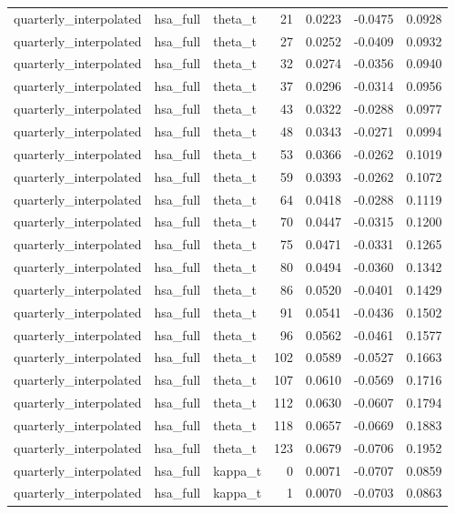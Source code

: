 \begin{tabular}{lllrrrr}
quarterly\_interpolated & hsa\_full & theta\_t & 21 & 0.0223 & -0.0475 & 0.0928 \\
quarterly\_interpolated & hsa\_full & theta\_t & 27 & 0.0252 & -0.0409 & 0.0932 \\
quarterly\_interpolated & hsa\_full & theta\_t & 32 & 0.0274 & -0.0356 & 0.0940 \\
quarterly\_interpolated & hsa\_full & theta\_t & 37 & 0.0296 & -0.0314 & 0.0956 \\
quarterly\_interpolated & hsa\_full & theta\_t & 43 & 0.0322 & -0.0288 & 0.0977 \\
quarterly\_interpolated & hsa\_full & theta\_t & 48 & 0.0343 & -0.0271 & 0.0994 \\
quarterly\_interpolated & hsa\_full & theta\_t & 53 & 0.0366 & -0.0262 & 0.1019 \\
quarterly\_interpolated & hsa\_full & theta\_t & 59 & 0.0393 & -0.0262 & 0.1072 \\
quarterly\_interpolated & hsa\_full & theta\_t & 64 & 0.0418 & -0.0288 & 0.1119 \\
quarterly\_interpolated & hsa\_full & theta\_t & 70 & 0.0447 & -0.0315 & 0.1200 \\
quarterly\_interpolated & hsa\_full & theta\_t & 75 & 0.0471 & -0.0331 & 0.1265 \\
quarterly\_interpolated & hsa\_full & theta\_t & 80 & 0.0494 & -0.0360 & 0.1342 \\
quarterly\_interpolated & hsa\_full & theta\_t & 86 & 0.0520 & -0.0401 & 0.1429 \\
quarterly\_interpolated & hsa\_full & theta\_t & 91 & 0.0541 & -0.0436 & 0.1502 \\
quarterly\_interpolated & hsa\_full & theta\_t & 96 & 0.0562 & -0.0461 & 0.1577 \\
quarterly\_interpolated & hsa\_full & theta\_t & 102 & 0.0589 & -0.0527 & 0.1663 \\
quarterly\_interpolated & hsa\_full & theta\_t & 107 & 0.0610 & -0.0569 & 0.1716 \\
quarterly\_interpolated & hsa\_full & theta\_t & 112 & 0.0630 & -0.0607 & 0.1794 \\
quarterly\_interpolated & hsa\_full & theta\_t & 118 & 0.0657 & -0.0669 & 0.1883 \\
quarterly\_interpolated & hsa\_full & theta\_t & 123 & 0.0679 & -0.0706 & 0.1952 \\
quarterly\_interpolated & hsa\_full & kappa\_t & 0 & 0.0071 & -0.0707 & 0.0859 \\
quarterly\_interpolated & hsa\_full & kappa\_t & 1 & 0.0070 & -0.0703 & 0.0863 \\

\end{tabular}
